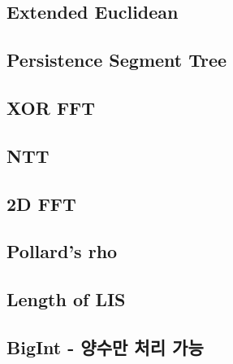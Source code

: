 \documentclass[10pt,landscape,a4paper,twocolumn]{article}
\begin{document}
\subsection{Extended Euclidean}


\subsection{Persistence Segment Tree}


\subsection{XOR FFT}


\subsection{NTT}


\subsection{2D FFT}


%
\subsection{Pollard's rho}


%
%
%

\subsection{Length of LIS}


\newpage
\subsection{BigInt - 양수만 처리 가능}



\end{document}
